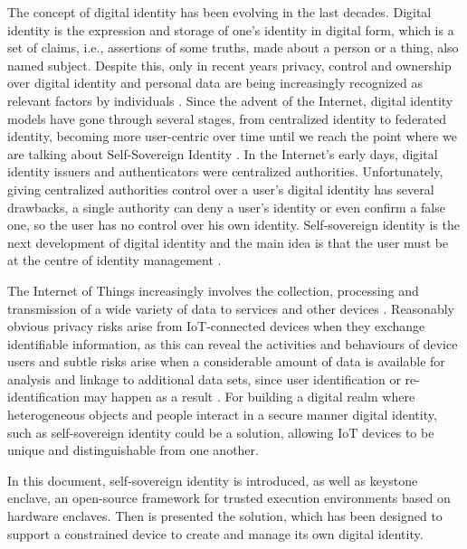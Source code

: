
The concept of digital identity has been evolving in the last decades. Digital identity is the expression and storage of one's identity in digital form, which is a set of claims, i.e., assertions of some truths, made about a person or a thing, also named subject. Despite this, only in recent years privacy, control and ownership over digital identity and personal data are being increasingly recognized as relevant factors by individuals \cite{TheLawsOfIdentity}. 
Since the advent of the Internet, digital identity models have gone through several stages, from centralized identity to federated identity, becoming more user-centric over time until we reach the point where we are talking about Self-Sovereign Identity \cite{ThePathToSSI}.
In the Internet's early days, digital identity issuers and authenticators were centralized authorities. Unfortunately, giving centralized authorities control over a user's digital identity has several drawbacks, a single authority can deny a user's identity or even confirm a false one, so the user has no control over his own identity. Self-sovereign identity is the next development of digital identity and the main idea is that the user must be at the centre of identity management \cite{ThePathToSSI}.


The Internet of Things increasingly involves the collection, processing and transmission of a wide variety of data to services and other devices \cite{wilson2018digital}. Reasonably obvious privacy risks arise from IoT-connected devices when they exchange identifiable information, as this can reveal the activities and behaviours of device users and subtle risks arise when a considerable amount of data is available for analysis and linkage to additional data sets, since user identification or re-identification may happen as a result \cite{wilson2018digital}. For building a digital realm where heterogeneous objects and people interact in a secure manner digital identity, such as self-sovereign identity could be a solution, allowing IoT devices to be unique and distinguishable from one another.


In this document, self-sovereign identity is introduced, as well as keystone enclave, an open-source framework for trusted execution environments based on hardware enclaves. Then is presented the solution, which has been designed to support a constrained device to create and manage its own digital identity. 


